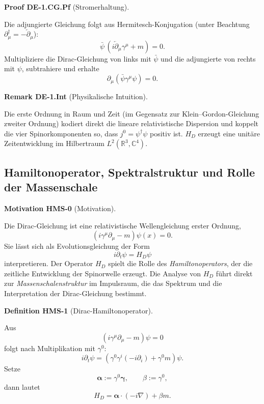 \documentclass[10pt, letterpaper]{article}
\newcommand{\R}{\mathbb{R}}
\newcommand{\C}{\mathbb{C}}
\newcommand{\CustomHeading}[3]{%
  \par\medskip\noindent%
  \textbf{#1 #2} \textnormal{(#3)}.\enskip%
}
\newenvironment{DEF}[2]{\begin{unitbox}\CustomHeading{Definition}{#1}{#2}}{\end{unitbox}}
\newenvironment{REM}[2]{\begin{unitbox}\CustomHeading{Remark}{#1}{#2}}{\end{unitbox}}
\newenvironment{MOT}[2]{\begin{unitbox}\CustomHeading{Motivation}{#1}{#2}}{\end{unitbox}}
\newenvironment{PROOF}[2]{\begin{unitbox}\CustomHeading{Proof}{#1}{#2}}{\end{unitbox}}
\begin{document}
\begin{PROOF}{DE-1.CG.Pf}{Stromerhaltung}
Die adjungierte Gleichung folgt aus Hermitesch-Konjugation (unter Beachtung $\partial_\mu^\dagger=-\overleftarrow{\partial}_\mu$):
\[
\bar\psi\,(i\overleftarrow{\partial}_\mu\gamma^\mu+m)=0.
\]
Multipliziere die Dirac-Gleichung von links mit $\bar\psi$ und die adjungierte von rechts mit $\psi$, subtrahiere und erhalte
\[
\partial_\mu(\bar\psi\gamma^\mu\psi)=0.
\]
\end{PROOF}

\begin{REM}{DE-1.Int}{Physikalische Intuition}
Die erste Ordnung in Raum und Zeit (im Gegensatz zur Klein--Gordon-Gleichung zweiter Ordnung) kodiert direkt die lineare relativistische Dispersion und koppelt die vier Spinorkomponenten so, dass $j^0=\psi^\dagger\psi$ positiv ist. $H_D$ erzeugt eine unitäre Zeitentwicklung im Hilbertraum $L^2(\R^3,\C^4)$.
\end{REM}


\subsection{Hamiltonoperator, Spektralstruktur und Rolle der Massenschale}

\begin{MOT}{HMS-0}{Motivation}
Die Dirac-Gleichung ist eine relativistische Wellengleichung erster Ordnung,
\[
 (i\gamma^\mu\partial_\mu - m)\psi(x)=0.
\]
Sie lässt sich als Evolutionsgleichung der Form
\[
 i\partial_t\psi=H_D\psi
\]
interpretieren. Der Operator $H_D$ spielt die Rolle des \emph{Hamiltonoperators}, der die zeitliche Entwicklung der Spinorwelle erzeugt.  
Die Analyse von $H_D$ führt direkt zur \emph{Massenschalenstruktur} im Impulsraum, die das Spektrum und die Interpretation der Dirac-Gleichung bestimmt.
\end{MOT}

\begin{DEF}{HMS-1}{Dirac-Hamiltonoperator}
Aus
\[
 (i\gamma^\mu\partial_\mu - m)\psi=0
\]
folgt nach Multiplikation mit $\gamma^0$:
\[
 i\partial_t\psi = (\gamma^0\gamma^i(-i\partial_i) + \gamma^0 m)\psi.
\]
Setze
\[
 \boldsymbol{\alpha}:=\gamma^0\boldsymbol{\gamma},\qquad \beta:=\gamma^0,
\]
dann lautet
\[
 \boxed{H_D = \boldsymbol{\alpha}\cdot(-i\nabla) + \beta m.}
\]
\end{DEF}
\end{document}
